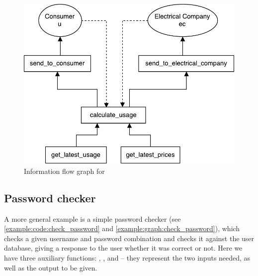 
\begin{figure}
  \centering
  \includegraphics[scale=0.8]{figures/dlm_calculate_bill}
  \caption{Information flow graph for }
  \label{example:graph:calculate_bill}
\end{figure}

\subsection{Password checker}\label{example:sec:check_password}
A more general example is a simple password checker (see \cref{example:code:check_password} and \cref{example:graph:check_password}), which checks a given username and password combination and checks it against the user database, giving a response to the user whether it was correct or not.
Here we have three auxiliary functions: , , and  -- they represent the two inputs needed, as well as the output to be given.


